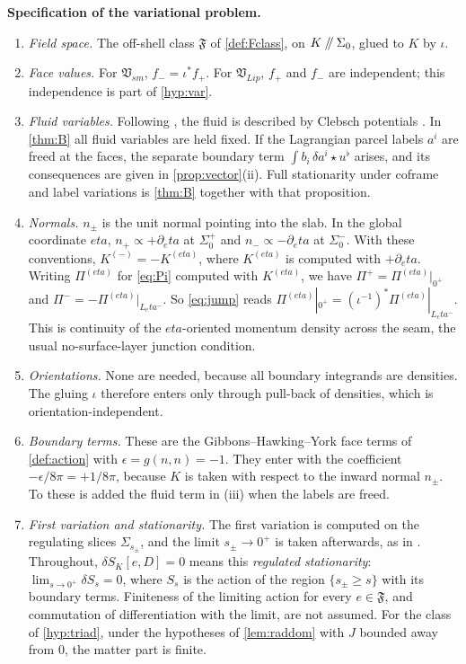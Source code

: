 \documentclass[11pt]{article}
\theoremstyle{canonmath}
\theoremstyle{canonpostulate}
\theoremstyle{canonproposition}
\theoremstyle{canonmath}
\theoremstyle{canonproposition}
\providecommand{\cutK}{\Klein\mathbin{/\mkern-5mu/}\Sigma_0}
\providecommand{\Vlip}{\mathfrak{V}_{\mathrm{Lip}}}
\providecommand{\Vsm}{\mathfrak{V}_{\mathrm{sm}}}
\providecommand{\Fcl}{\mathfrak{F}}
\providecommand{\Klein}{\mathcal{K}}
\def\mathrm#1{#1}%
\def\mathcal#1{#1}%
\def\eta{eta}%
\begin{document}
\textbf{Specification of the variational problem.}
\begin{enumerate}[label=(\roman*)]
\item \emph{Field space.} The off-shell class $\Fcl$ of \cref{def:Fclass}, on $\cutK$, glued to $\Klein$ by $\iota$.
\item \emph{Face values.} For $\Vsm$, $f_- = \iota^*f_+$. For $\Vlip$, $f_+$ and $f_-$ are independent; this independence is part of \ref{hyp:var}.
\item \emph{Fluid variables.} Following \cite{TBT2026}, the fluid is described by Clebsch potentials \cite{Schutz1970}. In \cref{thm:B} all fluid variables are held fixed. If the Lagrangian parcel labels $a^i$ are freed at the faces, the separate boundary term $\int b_i\,\delta a^i\star u^\flat$ arises, and its consequences are given in \cref{prop:vector}(ii). Full stationarity under coframe and label variations is \cref{thm:B} together with that proposition.
\item \emph{Normals.} $n_\pm$ is the unit normal pointing into the slab. In the global coordinate $\eta$, $n_+\propto+\partial_\eta$ at $\Sigma_0^+$ and $n_-\propto-\partial_\eta$ at $\Sigma_0^-$. With these conventions, $K^{(-)} = -K^{(\eta)}$, where $K^{(\eta)}$ is computed with $+\partial_\eta$. Writing $\Pi^{(\eta)}$ for \eqref{eq:Pi} computed with $K^{(\eta)}$, we have $\Pi^+ = \Pi^{(\eta)}|_{0^+}$ and $\Pi^- = -\Pi^{(\eta)}|_{L_\eta^-}$. So \eqref{eq:jump} reads $\Pi^{(\eta)}|_{0^+} = (\iota^{-1})^*\Pi^{(\eta)}|_{L_\eta^-}$. This is continuity of the $\eta$-oriented momentum density across the seam, the usual no-surface-layer junction condition.
\item \emph{Orientations.} None are needed, because all boundary integrands are densities. The gluing $\iota$ therefore enters only through pull-back of densities, which is orientation-independent.
\item \emph{Boundary terms.} These are the Gibbons--Hawking--York face terms of \cref{def:action} with $\epsilon = g(n,n) = -1$. They enter with the coefficient $-\epsilon/8\pi = +1/8\pi$, because $K$ is taken with respect to the inward normal $n_\pm$. To these is added the fluid term in (iii) when the labels are freed.
\item \emph{First variation and stationarity.} The first variation is computed on the regulating slices $\Sigma_{s_\pm}$, and the limit $s_\pm\to0^+$ is taken afterwards, as in \cite{TBT2026}. Throughout, $\delta\mathcal{S}_{\Klein}[e,\mathcal{D}] = 0$ means this \emph{regulated stationarity}: $\lim_{s\to0^+}\delta\mathcal{S}_s = 0$, where $\mathcal{S}_s$ is the action of the region $\{s_\pm\ge s\}$ with its boundary terms. Finiteness of the limiting action for every $e\in\Fcl$, and commutation of differentiation with the limit, are not assumed. For the class of \ref{hyp:triad}, under the hypotheses of \cref{lem:raddom} with $J$ bounded away from $0$, the matter part is finite.
\end{enumerate}
\end{document}
